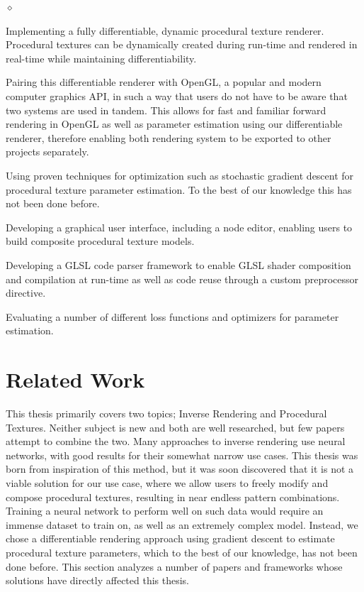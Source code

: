 \begin{list}{$\diamond$}{}
    \item Implementing a fully differentiable, dynamic procedural texture renderer. Procedural textures can be dynamically created during run-time and rendered in real-time while maintaining differentiability.
    \item Pairing this differentiable renderer with OpenGL, a popular and modern computer graphics API, in such a way that users do not have to be aware that two systems are used in tandem. This allows for fast and familiar forward rendering in OpenGL as well as parameter estimation using our differentiable renderer, therefore enabling both rendering system to be exported to other projects separately.
    \item Using proven techniques for optimization such as stochastic gradient descent for procedural texture parameter estimation. To the best of our knowledge this has not been done before. 
    \item Developing a graphical user interface, including a node editor, enabling users to build composite procedural texture models.
    \item Developing a GLSL code parser framework to enable GLSL shader composition and compilation at run-time as well as code reuse through a custom preprocessor directive.
    \item Evaluating a number of different loss functions and optimizers for parameter estimation.
\end{list}

\section{Related Work}
This thesis primarily covers two topics; Inverse Rendering and Procedural Textures. Neither subject is new and both are well researched, but few papers attempt to combine the two. Many approaches to inverse rendering use neural networks, with good results for their somewhat narrow use cases. This thesis was born from inspiration of this method, but it was soon discovered that it is not a viable solution for our use case, where we allow users to freely modify and compose procedural textures, resulting in near endless pattern combinations. Training a neural network to perform well on such data would require an immense dataset to train on, as well as an extremely complex model. Instead, we chose a differentiable rendering approach using gradient descent to estimate procedural texture parameters, which to the best of our knowledge, has not been done before. This section analyzes a number of papers and frameworks whose solutions have directly affected this thesis.

